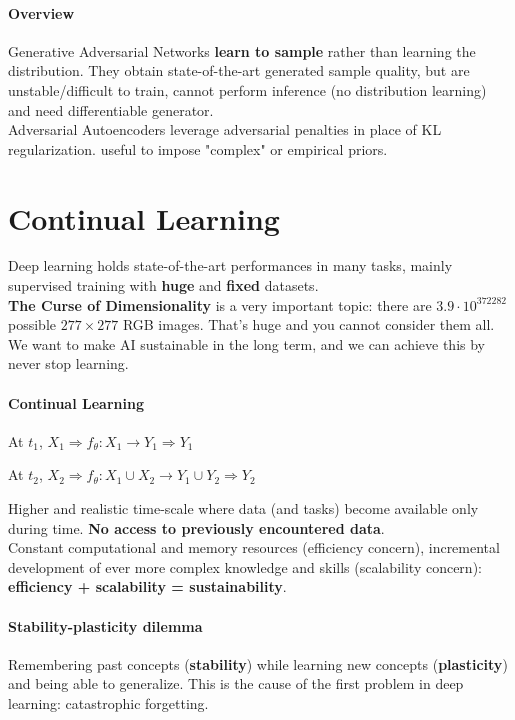 \documentclass[10pt]{report}
\begin{document}
\paragraph{Overview} Generative Adversarial Networks \textbf{learn to sample} rather than learning the distribution. They obtain state-of-the-art generated sample quality, but are unstable/difficult to train, cannot perform inference (no distribution learning) and need differentiable generator.\\
Adversarial Autoencoders leverage adversarial penalties in place of KL regularization. useful to impose "complex" or empirical priors.
\section{Continual Learning}
Deep learning holds state-of-the-art performances in many tasks, mainly supervised training with \textbf{huge} and \textbf{fixed} datasets.\\
\textbf{The Curse of Dimensionality} is a very important topic: there are $3.9\cdot10^{372282}$ possible $277\times277$ RGB images. That's huge and you cannot consider them all.\\
We want to make AI sustainable in the long term, and we can achieve this by never stop learning.
\paragraph{Continual Learning}
\begin{list}{}{}
	\item At $t_1$, $X_1\Longrightarrow f_\theta :X_1\rightarrow Y_1 \Longrightarrow Y_1$
	\item At $t_2$, $X_2\Longrightarrow f_\theta :X_1\cup X_2\rightarrow Y_1\cup Y_2 \Longrightarrow Y_2$
\end{list}
Higher and realistic time-scale where data (and tasks) become available only during time. \textbf{No access to previously encountered data}.\\
Constant computational and memory resources (efficiency concern), incremental development of ever more complex knowledge and skills (scalability concern): \textbf{efficiency + scalability = sustainability}.
\paragraph{Stability-plasticity dilemma} Remembering past concepts (\textbf{stability}) while learning new concepts (\textbf{plasticity}) and being able to generalize. This is the cause of the first problem in deep learning: catastrophic forgetting.
\end{document}
